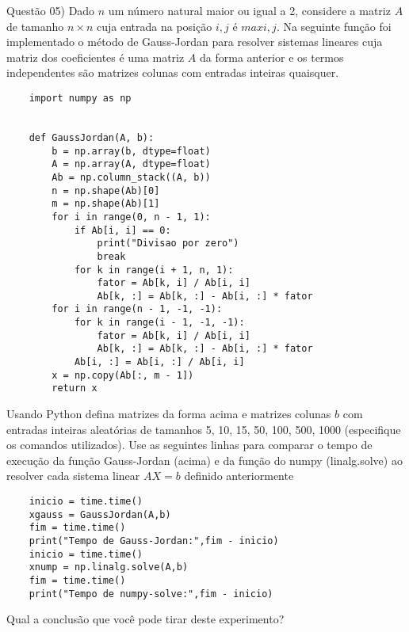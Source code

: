 
\noindent \textcolor{COLOR1}{Questão 05)} Dado $n$ um número natural maior ou igual a 2, considere a matriz $A$ de tamanho
$n \times n$ cuja entrada na posição $i, j$ é $max{i, j}$. Na seguinte função foi implementado o método
de Gauss-Jordan para resolver sistemas lineares cuja matriz dos coeficientes é uma matriz $A$ da
forma anterior e os termos independentes são matrizes colunas com entradas inteiras quaisquer.
\\

\begin{lstlisting}
    import numpy as np


    def GaussJordan(A, b):
        b = np.array(b, dtype=float)
        A = np.array(A, dtype=float)
        Ab = np.column_stack((A, b))
        n = np.shape(Ab)[0]
        m = np.shape(Ab)[1]
        for i in range(0, n - 1, 1):
            if Ab[i, i] == 0:
                print("Divisao por zero")
                break
            for k in range(i + 1, n, 1):
                fator = Ab[k, i] / Ab[i, i]
                Ab[k, :] = Ab[k, :] - Ab[i, :] * fator
        for i in range(n - 1, -1, -1):
            for k in range(i - 1, -1, -1):
                fator = Ab[k, i] / Ab[i, i]
                Ab[k, :] = Ab[k, :] - Ab[i, :] * fator
            Ab[i, :] = Ab[i, :] / Ab[i, i]
        x = np.copy(Ab[:, m - 1])
        return x
\end{lstlisting}


Usando Python defina matrizes da forma acima e matrizes colunas $b$ com entradas inteiras aleatórias de tamanhos 5, 10, 15, 50, 100, 500, 1000 (especifique os comandos utilizados). Use as seguintes linhas para comparar o tempo de execução da função Gauss-Jordan (acima) e da função do numpy (linalg.solve) ao resolver cada sistema linear $AX = b$ definido anteriormente
\\

\begin{lstlisting}
    inicio = time.time()
    xgauss = GaussJordan(A,b)
    fim = time.time()
    print("Tempo de Gauss-Jordan:",fim - inicio)
    inicio = time.time()
    xnump = np.linalg.solve(A,b)
    fim = time.time()
    print("Tempo de numpy-solve:",fim - inicio)    
\end{lstlisting}

Qual a conclusão que você pode tirar deste experimento?